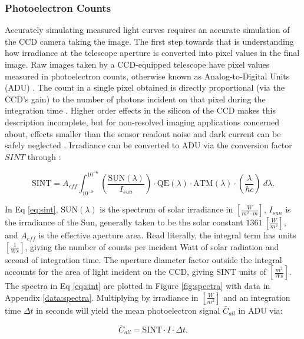 \subsubsection{Photoelectron Counts}

Accurately simulating measured light curves requires an accurate simulation of the CCD camera taking the image. The first step towards that is understanding how irradiance at the telescope aperture is converted into pixel values in the final image. Raw images taken by a CCD-equipped telescope have pixel values measured in photoelectron counts, otherwise known as Analog-to-Digital Units (ADU) \cite{krag2003}. The count in a single pixel obtained is directly proportional (via the CCD's gain) to the number of
photons incident on that pixel during the integration time \cite{krag2003}. Higher order effects in the silicon of
the CCD makes this description incomplete, but for non-resolved imaging applications
concerned about, effects smaller than the sensor readout noise and dark current can be safely neglected
\cite{frueh2019notes}. Irradiance can be converted to ADU via the conversion factor $SINT$
through \cite{krag2003}:

\begin{equation} \label{eq:sint}
 \textrm{SINT} = A_{eff}
	\int_{10^{-8}}^{10^{-6}}{ \left( \frac{\textrm{SUN}(\lambda)}{I_{sun}} \right) \cdot \textrm{QE}(\lambda) \cdot \textrm{ATM}(\lambda)
  \cdot \left( \frac{\lambda}{h c} \right) \: d\lambda}.
\end{equation}

In Eq \ref{eq:sint}, $\textrm{SUN}(\lambda)$ is the spectrum of solar irradiance in 
$\left[\frac{W}{m^2\cdot m} \right]$, $I_{sun}$ is the irradiance of the Sun, generally taken to be
the solar constant $1361 \: \left[ \frac{W}{m^2} \right]$, and $A_{eff}$ is the effective aperture area. Read literally, the integral term has
units $\left[ \frac{1}{Ws} \right]$, giving the number of counts per incident Watt of solar
radiation and second of integration time. The aperture diameter factor outside the integral accounts
for the area of light incident on the CCD, giving $\textrm{SINT}$ units of $\left[ \frac{m^2}{Ws}
\right]$. The spectra in Eq \ref{eq:sint} are plotted in Figure \ref{fig:spectra} with data in Appendix \ref{data:spectra}. Multiplying by irradiance in $\left[ \frac{W}{m^2} \right]$ and an integration time $\Delta t$ 
in seconds will yield the mean photoelectron signal $\bar{C}_{all}$ in ADU via:

\begin{equation} \label{eq:irrad_to_count}
  \bar{C}_{all} = \textrm{SINT} \cdot I \cdot \Delta t.
\end{equation}

